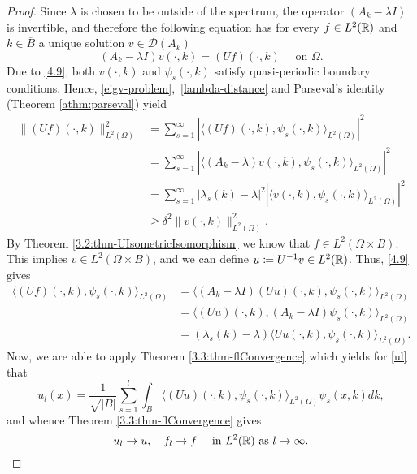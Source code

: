 \begin{theorem}
\begin{proof}
		Since $\lambda$ is chosen to be outside of the spectrum, the operator $(A_{k} - \lambda I)$ is invertible, and therefore the following equation has for every $f \in L^{2}(\mathbb{R})$ and $k \in \overline{B}$ a unique solution $v \in \mathcal{D}(A_{k})$
		\begin{equation}
			(A_{k} - \lambda I) v(\cdot, k) = (Uf)(\cdot, k) \quad \text{ on } \Omega. \label{4.9}			
		\end{equation}
		Due to \eqref{4.9}, both $v(\cdot, k)$ and $\psi_{s}(\cdot, k)$ satisfy quasi-periodic boundary conditions. Hence, \eqref{eigv-problem}, \eqref{lambda-distance} and Parseval's identity (Theorem \ref{athm:parseval}) yield
		\begin{align*}
			\| (Uf)(\cdot, k)\|^{2}_{L^{2}(\Omega)} & = \sum_{s=1}^{\infty} |\langle (Uf)(\cdot, k), \psi_{s}(\cdot, k)\rangle_{L^{2}(\Omega)}|^{2} \\
			& = \sum_{s=1}^{\infty}|\langle (A_{k} - \lambda) v(\cdot, k), \psi_{s}(\cdot, k)\rangle_{L^{2}(\Omega)}|^{2} \\
			& = \sum_{s=1}^{\infty} |\lambda_{s}(k) - \lambda|^{2} |\langle v(\cdot, k), \psi_{s}(\cdot, k)\rangle_{L^{2}(\Omega)}|^{2} \\
			& \geq \delta^{2} \| v(\cdot, k)\|^{2}_{L^{2}(\Omega)}.
		\end{align*}
		By Theorem \ref{3.2:thm-UIsometricIsomorphism} we know that $f \in L^{2}(\Omega \times B)$. This implies $v \in L^{2}(\Omega \times B)$, and we can define $u \coloneqq U^{-1} v \in L^{2}(\mathbb{R})$. Thus, \eqref{4.9} gives
			\begin{align*}
				\langle (Uf)(\cdot, k), \psi_{s}(\cdot, k) \rangle_{L^{2}(\Omega)} & = \langle (A_{k} - \lambda I)(Uu)(\cdot, k), \psi_{s}(\cdot, k) \rangle_{L^{2}(\Omega)} \\
					& = \langle (Uu)(\cdot,k), (A_{k} - \lambda I) \psi_{s}(\cdot, k) \rangle_{L^{2}(\Omega)} \\
					& = (\lambda_{s}(k) - \lambda) \langle Uu(\cdot, k), \psi_{s}(\cdot, k) \rangle_{L^{2}(\Omega)}.
			\end{align*}
		Now, we are able to apply Theorem \ref{3.3:thm-flConvergence} which yields for \eqref{ul} that
			\[ u_{l}(x) = \frac{1}{\sqrt{|B|}} \sum_{s=1}^{l} \int_{B} \langle (Uu)(\cdot, k), \psi_{s}(\cdot, k)\rangle_{L^{2}(\Omega)} \psi_{s}(x, k) dk, \]
		and whence Theorem \ref{3.3:thm-flConvergence} gives
			\begin{equation}
				u_{l} \rightarrow u, \quad f_{l} \rightarrow f \quad \text{ in } L^{2}(\R) \text{ as } l \rightarrow \infty. \label{ulflconvergence}

\end{equation}
\end{proof}
\end{theorem}
